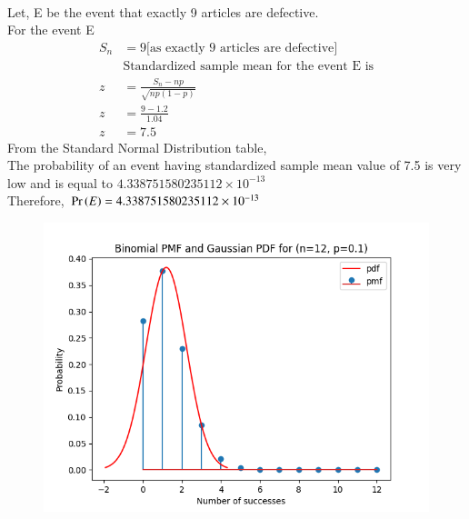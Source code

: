 \documentclass[journal,12pt,twocolumn]{IEEEtran}
\begin{document}
 \\Let, E be the event that exactly 9 articles are defective.
 \\For the event E
 \begin{align}
    S_n &= 9 \text{[as exactly 9 articles are defective]}\nonumber\\
    &\text{Standardized sample mean for the event E is} \nonumber\\
    z &= \frac{S_n-np}{\sqrt{np(1-p)}}\\
    z &= \frac{9-1.2}{1.04}\nonumber\\
    z &= 7.5
    \end{align}
From the Standard Normal Distribution table,
\\The probability of an event having standardized sample mean value of 7.5 is very low and is equal to $4.338751580235112 \times 10^{-13}$
\\Therefore, $\Pr\left(E\right) = 4.338751580235112 \times 10^{-13}$
\begin{figure}[h]
\centering
\includegraphics[width=\columnwidth]{./figs/graph.png}
\end{figure}
\end{document}
